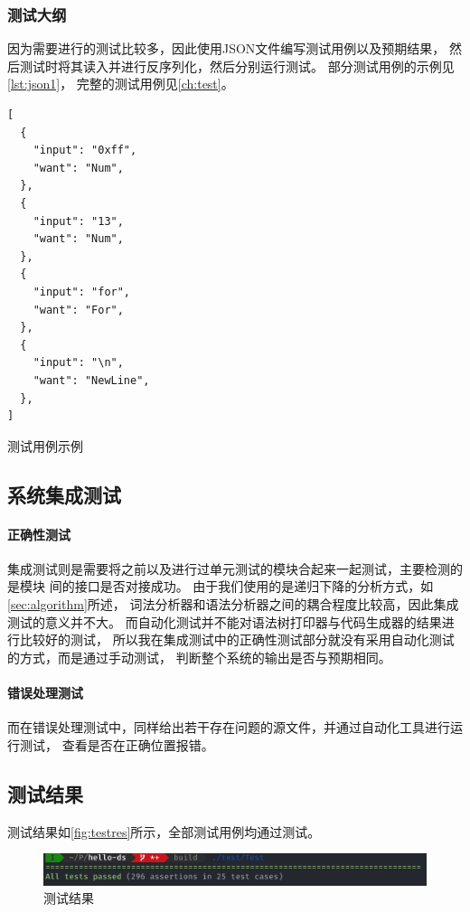 \subsubsection{测试大纲}

因为需要进行的测试比较多，因此使用JSON文件编写测试用例以及预期结果，
然后测试时将其读入并进行反序列化，然后分别运行测试。
部分测试用例的示例见\autoref{lst:json1}，
完整的测试用例见\autoref{ch:test}。

\begin{listing}[hbt]
\begin{verbatim}
[
  {
    "input": "0xff",
    "want": "Num",
  },
  {
    "input": "13",
    "want": "Num",
  },
  {
    "input": "for",
    "want": "For",
  },
  {
    "input": "\n",
    "want": "NewLine",
  },
]
\end{verbatim}
\caption{测试用例示例}\label{lst:json1}
\end{listing}

\subsection{系统集成测试}

\paragraph{正确性测试}
集成测试则是需要将之前以及进行过单元测试的模块合起来一起测试，主要检测的是模块
间的接口是否对接成功。
由于我们使用的是递归下降的分析方式，如\autoref{sec:algorithm}所述，
词法分析器和语法分析器之间的耦合程度比较高，因此集成测试的意义并不大。
而自动化测试并不能对语法树打印器与代码生成器的结果进行比较好的测试，
所以我在集成测试中的正确性测试部分就没有采用自动化测试的方式，而是通过手动测试，
判断整个系统的输出是否与预期相同。

\paragraph{错误处理测试}
而在错误处理测试中，同样给出若干存在问题的源文件，并通过自动化工具进行运行测试，
查看是否在正确位置报错。

\subsection{测试结果}

测试结果如\autoref{fig:testres}所示，全部测试用例均通过测试。

\begin{figure}[hbt]
  \centering
  \includegraphics[scale=.4]{test.png}
  \caption{测试结果}\label{fig:testres}
\end{figure}

